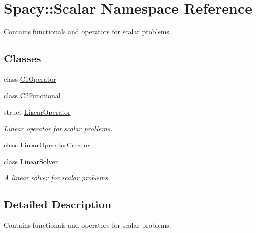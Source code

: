 \hypertarget{namespaceSpacy_1_1Scalar}{\section{\-Spacy\-:\-:\-Scalar \-Namespace \-Reference}
\label{namespaceSpacy_1_1Scalar}
}


\-Contains functionals and operators for scalar problems.  


\subsection*{\-Classes}
\begin{DoxyCompactItemize}
\item 
class \hyperlink{classSpacy_1_1Scalar_1_1C1Operator}{\-C1\-Operator}
\item 
class \hyperlink{classSpacy_1_1Scalar_1_1C2Functional}{\-C2\-Functional}
\item 
struct \hyperlink{structSpacy_1_1Scalar_1_1LinearOperator}{\-Linear\-Operator}
\begin{DoxyCompactList}\small\item\em \-Linear operator for scalar problems. \end{DoxyCompactList}\item 
class \hyperlink{classSpacy_1_1Scalar_1_1LinearOperatorCreator}{\-Linear\-Operator\-Creator}
\item 
class \hyperlink{classSpacy_1_1Scalar_1_1LinearSolver}{\-Linear\-Solver}
\begin{DoxyCompactList}\small\item\em \-A linear solver for scalar problems. \end{DoxyCompactList}\end{DoxyCompactItemize}


\subsection{\-Detailed \-Description}
\-Contains functionals and operators for scalar problems. 
